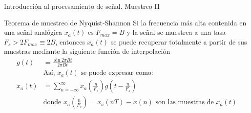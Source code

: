 \begin{frame}{Introducción al procesamiento de señal. Muestreo II}
	\begin{block}{\centering \footnotesize Teorema de muestreo de Nyquist-Shannon}
		Si la frecuencia más alta contenida en una señal analógica $x_{a}(t)$ es $F_{max}=B$ y la señal se muestrea a una tasa $F_{s}>2F_{max}\equiv 2B$, entonces $x_{a}(t)$ se puede recuperar totalmente a partir de sus muestras mediante la siguiente función de interpolación
		\begin{align}
		g(t)&=\frac{\sin 2\pi Bt}{2\pi Bt} \\ \nonumber
		&\text{Así, }x_{a}(t)\text{ se puede expresar como:} \\ \nonumber
		x_{a}(t)&=\sum _{n=-\infty }^{\infty }x_{a}\left({\frac {n}{F_{s}}}\right)g\left(t-{\frac {n}{F_{s}}}\right)\\ \nonumber
		&\text{donde }x_{a}\left({\frac {n}{F_{s}}}\right)=x_{a}\left(nT\right)\equiv x\left(n\right)\text{ son las muestras de }x_{a}\left(t\right)
		\end{align}
	\end{block}
	\vspace*{-10pt}
	\begin{columns}
		{
			\begin{figure}[ht!]
				\centering
\end{figure}}
\end{columns}
\end{frame}
